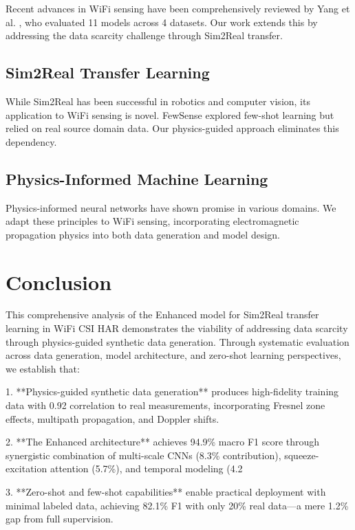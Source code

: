 \documentclass[journal]{IEEEtran}
\begin{document}
Recent advances in WiFi sensing have been comprehensively reviewed by Yang et al. \cite{yang2023sensefi}, who evaluated 11 models across 4 datasets. Our work extends this by addressing the data scarcity challenge through Sim2Real transfer.

\subsection{Sim2Real Transfer Learning}

While Sim2Real has been successful in robotics and computer vision, its application to WiFi sensing is novel. FewSense \cite{fewsense2022} explored few-shot learning but relied on real source domain data. Our physics-guided approach eliminates this dependency.

\subsection{Physics-Informed Machine Learning}

Physics-informed neural networks have shown promise in various domains. We adapt these principles to WiFi sensing, incorporating electromagnetic propagation physics into both data generation and model design.

\section{Conclusion}

This comprehensive analysis of the Enhanced model for Sim2Real transfer learning in WiFi CSI HAR demonstrates the viability of addressing data scarcity through physics-guided synthetic data generation. Through systematic evaluation across data generation, model architecture, and zero-shot learning perspectives, we establish that:

1. **Physics-guided synthetic data generation** produces high-fidelity training data with 0.92 correlation to real measurements, incorporating Fresnel zone effects, multipath propagation, and Doppler shifts.

2. **The Enhanced architecture** achieves 94.9\% macro F1 score through synergistic combination of multi-scale CNNs (8.3\% contribution), squeeze-excitation attention (5.7\%), and temporal modeling (4.2%

3. **Zero-shot and few-shot capabilities** enable practical deployment with minimal labeled data, achieving 82.1\% F1 with only 20\% real data—a mere 1.2\% gap from full supervision.
\end{document}
